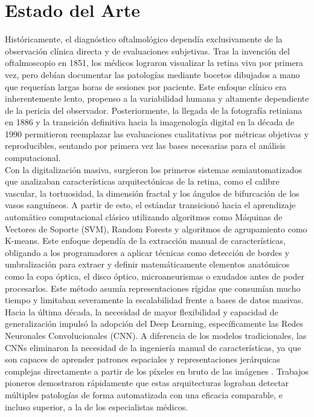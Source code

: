 \documentclass[12pt, a4paper]{article}
\begin{document}
\newpage
\section{Estado del Arte}
Históricamente, el diagnóstico oftalmológico dependía exclusivamente de la observación clínica directa y de evaluaciones subjetivas. Tras la invención del oftalmoscopio en 1851, los médicos lograron visualizar la retina viva por primera vez, pero debían documentar las patologías mediante bocetos dibujados a mano que requerían largas horas de sesiones por paciente. Este enfoque clínico era inherentemente lento, propenso a la variabilidad humana y altamente dependiente de la pericia del observador. Posteriormente, la llegada de la fotografía retiniana en 1886 y la transición definitiva hacia la imagenología digital en la década de 1990 permitieron reemplazar las evaluaciones cualitativas por métricas objetivas y reproducibles, sentando por primera vez las bases necesarias para el análisis computacional.\\

Con la digitalización masiva, surgieron los primeros sistemas semiautomatizados que analizaban características arquitectónicas de la retina, como el calibre vascular, la tortuosidad, la dimensión fractal y los ángulos de bifurcación de los vasos sanguíneos. A partir de esto, el estándar transicionó hacia el aprendizaje automático computacional clásico utilizando algoritmos como Máquinas de Vectores de Soporte (SVM), Random Forests y algoritmos de agrupamiento como K-means. Este enfoque dependía de la extracción manual de características, obligando a los programadores a aplicar técnicas como detección de bordes y umbralización para extraer y definir matemáticamente elementos anatómicos como la copa óptica, el disco óptico, microaneurismas o exudados antes de poder procesarlos. Este método asumía representaciones rígidas que consumían mucho tiempo y limitaban severamente la escalabilidad frente a bases de datos masivas.\\

Hacia la última década, la necesidad de mayor flexibilidad y capacidad de generalización impulsó la adopción del Deep Learning, específicamente las Redes Neuronales Convolucionales (CNN). A diferencia de los modelos tradicionales, las CNNs eliminaron la necesidad de la ingeniería manual de características, ya que son capaces de aprender patrones espaciales y representaciones jerárquicas complejas directamente a partir de los píxeles en bruto de las imágenes
. Trabajos pioneros demostraron rápidamente que estas arquitecturas lograban detectar múltiples patologías de forma automatizada con una eficacia comparable, e incluso superior, a la de los especialistas médicos.\\
\end{document}
